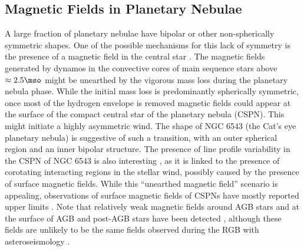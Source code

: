 \subsection{Magnetic Fields in Planetary Nebulae}
A large fraction of planetary nebulae have bipolar or other non-spherically symmetric shapes. 
One of the possible mechanisms for this lack of symmetry is the presence of a magnetic field in the central star \citep[See e.g.][]{Garc_a_Segura_1997,Chevalier_1994}. The magnetic fields generated by dynamos in the convective cores of main sequence stars above $\approx 2.5\mso$ might be unearthed by the vigorous mass loss during the planetary nebula phase. While the initial mass loss is predominantly spherically symmetric, once most of the hydrogen envelope is removed magnetic fields could appear at the surface of the compact central star of the planetary nebula (CSPN). This might initiate a highly asymmetric wind. The shape of NGC 6543 (the Cat's eye planetary nebula) is suggestive of such a transition, with an outer spherical region and an inner bipolar structure. The presence of line profile variability in the CSPN of NGC 6543 is also interesting \cite{Prinja_2012}, as it is linked to the presence of corotating interacting regions in the stellar wind, possibly caused by the presence of surface magnetic fields. While this ``unearthed magnetic field'' scenario is appealing, observations of surface magnetic fields of CSPNs have mostly reported upper limits \citep{Jordan_2012,Leone_2014,Asensio_Ramos_2014}. Note that relatively weak  magnetic fields around AGB stars \cite{Leal_Ferreira_2013} and at the surface of AGB and post-AGB stars have been detected \cite{L_bre_2014,Sabin_2014}, although these fields are unlikely to be the same fields observed during the RGB with asteroseismology \citep{Fuller_2015}. %


